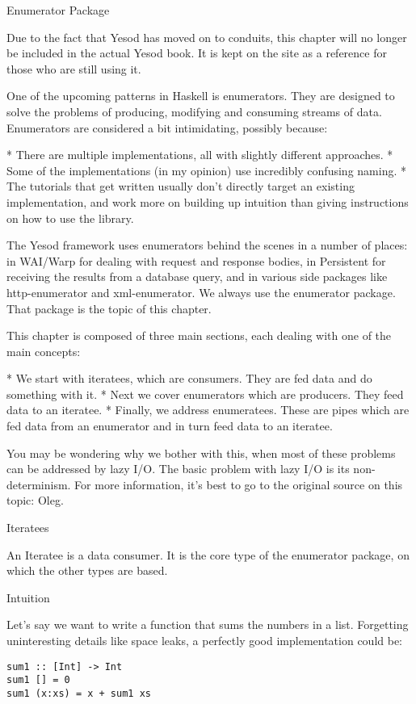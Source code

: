 Enumerator Package

Due to the fact that Yesod has moved on to conduits, this chapter will no longer be included in the actual Yesod book. It is kept on the site as a reference for those who are still using it.

One of the upcoming patterns in Haskell is enumerators. They are designed to solve the problems of producing, modifying and consuming streams of data. Enumerators are considered a bit intimidating, possibly because:

* There are multiple implementations, all with slightly different approaches.
* Some of the implementations (in my opinion) use incredibly confusing naming.
* The tutorials that get written usually don't directly target an existing implementation, and work more on building up intuition than giving instructions on how to use the library.

The Yesod framework uses enumerators behind the scenes in a number of places: in WAI/Warp for dealing with request and response bodies, in Persistent for receiving the results from a database query, and in various side packages like http-enumerator and xml-enumerator. We always use the enumerator package. That package is the topic of this chapter.

This chapter is composed of three main sections, each dealing with one of the main concepts:

* We start with iteratees, which are consumers. They are fed data and do something with it.
* Next we cover enumerators which are producers. They feed data to an iteratee.
* Finally, we address enumeratees. These are pipes which are fed data from an enumerator and in turn feed data to an iteratee.

You may be wondering why we bother with this, when most of these problems can be addressed by lazy I/O. The basic problem with lazy I/O is its non-determinism. For more information, it's best to go to the original source on this topic: Oleg.

Iteratees

An Iteratee is a data consumer. It is the core type of the enumerator package, on which the other types are based.

Intuition

Let's say we want to write a function that sums the numbers in a list. Forgetting uninteresting details like space leaks, a perfectly good implementation could be:

\begin{lstlisting}
sum1 :: [Int] -> Int
sum1 [] = 0
sum1 (x:xs) = x + sum1 xs
\end{lstlisting}


